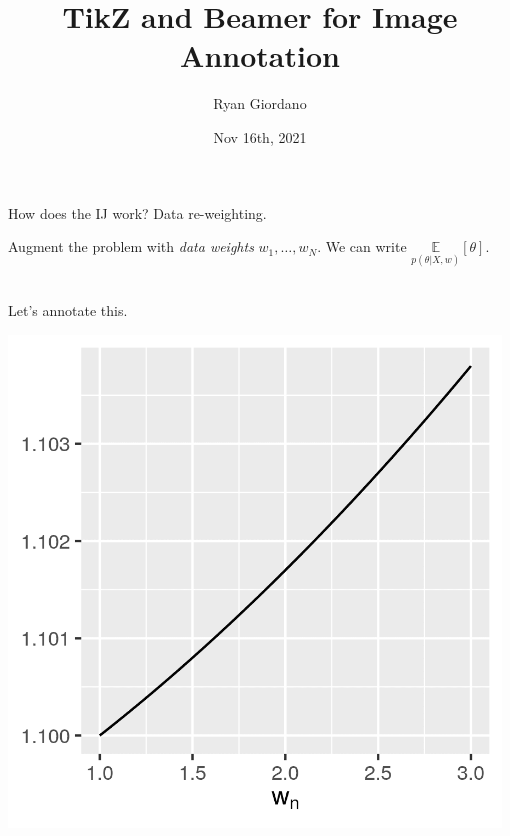 \documentclass[8pt]{beamer}\usepackage[]{graphicx}\usepackage[]{color}
\title{TikZ and Beamer for Image Annotation}
\author{Ryan Giordano}
\date{Nov 16th, 2021}
\institute{Massachusetts Institute of Technology}
\def\expect#1#2{\underset{#1}{\mathbb{E}}\left[#2\right]}
\def\xvec{X}
\def\w{w}
\begin{document}

\begin{frame}{How does the IJ work?  Data re-weighting.}

Augment the problem with {\em data weights} $\w_1, \ldots, \w_N$.
%
We can write $\expect{p(\theta \vert \xvec, \w)}{\theta}$.

\begin{minipage}{0.49\textwidth}
    \hfill\\
    Let's annotate this.
\end{minipage}
\begin{minipage}{0.49\textwidth}
    \includegraphics[width=0.98\textwidth]{e_beta_w}
\end{minipage}




\end{frame}







\end{document}
